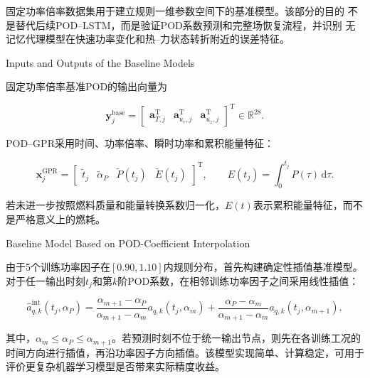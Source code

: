 固定功率倍率数据集用于建立规则一维参数空间下的基准模型。该部分的目的
不是替代后续POD--LSTM，而是验证POD系数预测和完整场恢复流程，并识别
无记忆代理模型在快速功率变化和热--力状态转折附近的误差特征。

{Inputs and Outputs of the Baseline Models}

固定功率倍率基准POD的输出向量为

\begin{equation}
	\boldsymbol y_j^{\mathrm{base}}
	=
	\begin{bmatrix}
		\boldsymbol a_{T,j}^{\mathrm T} &
		\boldsymbol a_{u_r,j}^{\mathrm T} &
		\boldsymbol a_{u_z,j}^{\mathrm T}
	\end{bmatrix}^{\mathrm T}
	\in\mathbb R^{28}.
	\label{eq:baseline_surrogate_output}
\end{equation}

POD--GPR采用时间、功率倍率、瞬时功率和累积能量特征：

\begin{equation}
	\boldsymbol x_j^{\mathrm{GPR}}
	=
	\begin{bmatrix}
		\widetilde t_j &
		\widetilde{\alpha}_P &
		\widetilde P(t_j) &
		\widetilde E(t_j)
	\end{bmatrix}^{\mathrm T},
	\qquad
	E(t_j)=\int_0^{t_j}P(\tau)\,\mathrm d\tau.
	\label{eq:baseline_gpr_features}
\end{equation}

若未进一步按照燃料质量和能量转换系数归一化，$E(t)$表示累积能量特征，而不是严格意义上的燃耗。

{Baseline Model Based on POD-Coefficient Interpolation}

由于5个训练功率因子在$[0.90,1.10]$内规则分布，首先构建确定性插值基准模型。对于任一输出时刻$t_j$和第$k$阶POD系数，在相邻训练功率因子之间采用线性插值：

\begin{equation}
	\widehat{a}_{q,k}^{\mathrm{int}}(t_j,\alpha_P)
	=
	\frac{\alpha_{m+1}-\alpha_P}{\alpha_{m+1}-\alpha_m}
	a_{q,k}(t_j,\alpha_m)
	+
	\frac{\alpha_P-\alpha_m}{\alpha_{m+1}-\alpha_m}
	a_{q,k}(t_j,\alpha_{m+1}),
	\label{eq:pod_coefficient_interpolation}
\end{equation}

其中，$\alpha_m\leq\alpha_P\leq\alpha_{m+1}$。若预测时刻不位于统一输出节点，则先在各训练工况的时间方向进行插值，再沿功率因子方向插值。该模型实现简单、计算稳定，可用于评价更复杂机器学习模型是否带来实际精度收益。

